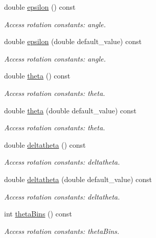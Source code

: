 \begin{DoxyCompactItemize}
double \hyperlink{struct_d_d4hep_1_1_x_m_l_1_1_dimension_aa607599ddbefe41c499f243ff0a5c38d}{epsilon} () const
\begin{DoxyCompactList}\small\item\em Access rotation constants\+: angle. \end{DoxyCompactList}\item 
double \hyperlink{struct_d_d4hep_1_1_x_m_l_1_1_dimension_a7e50224f557798a4aab0fb05ce4bb8b7}{epsilon} (double default\+\_\+value) const
\begin{DoxyCompactList}\small\item\em Access rotation constants\+: angle. \end{DoxyCompactList}\item 
double \hyperlink{struct_d_d4hep_1_1_x_m_l_1_1_dimension_a34223fdf2b6de29e9de4767f5dc8c6a9}{theta} () const
\begin{DoxyCompactList}\small\item\em Access rotation constants\+: theta. \end{DoxyCompactList}\item 
double \hyperlink{struct_d_d4hep_1_1_x_m_l_1_1_dimension_a84106d2e0e05a29b8803a49e7c3dee97}{theta} (double default\+\_\+value) const
\begin{DoxyCompactList}\small\item\em Access rotation constants\+: theta. \end{DoxyCompactList}\item 
double \hyperlink{struct_d_d4hep_1_1_x_m_l_1_1_dimension_a67755cfb0f2270c4dac9b6a8b3f80211}{deltatheta} () const
\begin{DoxyCompactList}\small\item\em Access rotation constants\+: deltatheta. \end{DoxyCompactList}\item 
double \hyperlink{struct_d_d4hep_1_1_x_m_l_1_1_dimension_a850b516752763ef8a1b39038dd0af32a}{deltatheta} (double default\+\_\+value) const
\begin{DoxyCompactList}\small\item\em Access rotation constants\+: deltatheta. \end{DoxyCompactList}\item 
int \hyperlink{struct_d_d4hep_1_1_x_m_l_1_1_dimension_a92b90fa35c34df20c9285472e1bea8eb}{theta\+Bins} () const
\begin{DoxyCompactList}\small\item\em Access rotation constants\+: theta\+Bins. \end{DoxyCompactList}\item 

\end{DoxyCompactItemize}
